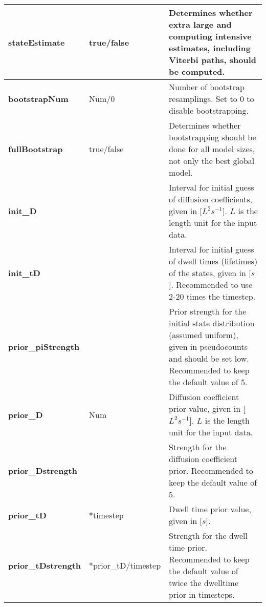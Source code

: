 \begin{longtable}{|m{}|>{\centering\arraybackslash}m{}|m{}|}
\textbf{stateEstimate}				&	  true/false						&		Determines whether extra large and computing intensive estimates, including Viterbi paths, should be computed.\\[0.5ex]  \hline 
\textbf{bootstrapNum}			&	  Num/0							&		Number of bootstrap resamplings. Set to 0 to disable bootstrapping.\\ [0.5ex]  \hline 
\textbf{fullBootstrap}				&	  true/false						&		Determines whether bootstrapping should be done for all model sizes, not only the best global model.\\[0.5ex]  \hline 
\textbf{init\_D	}						&	  [Num Num]					&		Interval for initial guess of diffusion coefficients, given in [$L^2s^{-1}$]. $L$ is the length unit for the input data.\\ [0.5ex]  \hline 
\textbf{init\_tD}						&	  [Num Num]					&		Interval for initial guess of dwell times (lifetimes) of the states, given in [$s$]. Recommended to use 2-20 times the timestep.\\ [0.5ex]  \hline 
\textbf{prior\_piStrength}		&	  5									&		Prior strength for the initial state distribution (assumed uniform), given in pseudocounts and should be set low. Recommended to keep the default value of 5.\\ [0.5ex]  \hline 
\textbf{prior\_D}						&	  Num								&		Diffusion coefficient prior value, given in [$L^2s^{-1}$]. $L$ is the length unit for the input data.\\ [0.5ex]  \hline 
\textbf{prior\_Dstrength}			&	  5									&		Strength for the diffusion coefficient prior. Recommended to keep the default value of 5.\\ [0.5ex]  \hline 
\textbf{prior\_tD}						&	  10*timestep					&		Dwell time prior value, given in [$s$].\\ [0.5ex]  \hline 
\textbf{prior\_tDstrength}		&	  2*prior\_tD/timestep		&		Strength for the dwell time prior. Recommended to keep the default value of twice the dwelltime prior in timesteps.\\ [1ex] %
\end{longtable}


\newpage

